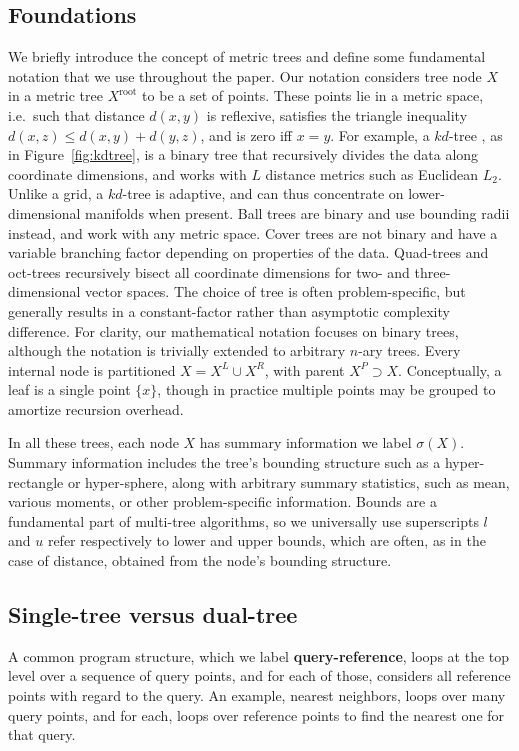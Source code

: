 \documentclass[twoside,leqno,twocolumn]{article}
\newcommand{\union}{\cup}
\newcommand{\fig}[1]{Figure~\ref{fig:#1}}
\newcommand{\mysub}[1]{\subsection{#1} }
\newcommand{\defterm}[1]{{\bf #1}}
\newcommand{\kdroot}[1]{#1^{\text{root}}}
\newcommand{\kdleft}[1]{#1^{\!L}}
\newcommand{\kdright}[1]{#1^{\!R}}
\newcommand{\kdparent}[1]{#1^{\!P}}
\newcommand{\dist}[2]{d(#1,#2)}
\newcommand{\outstat}{\sigma}
\begin{document}
\mysub{Foundations}
We briefly introduce the concept of metric trees and define some fundamental notation that we use throughout the paper.
Our notation considers tree node $X$ in a metric tree $\kdroot{X}$ to be a set of points.
These points lie in a metric space, i.e.~such that distance $\dist{x}{y}$ is reflexive, satisfies the triangle inequality $\dist{x}{z} \leq \dist{x}{y} + \dist{y}{z}$, and is zero iff $x = y$.
For example, a $kd$-tree \cite{preparata_kdtrees}, as in \fig{kdtree}, is a binary tree that recursively divides the data along coordinate dimensions, and works with $L$ distance metrics such as Euclidean $L_2$.
Unlike a grid, a $kd$-tree is adaptive, and can thus concentrate on lower-dimensional manifolds when present.
Ball trees \cite{anchors_balltrees_moore} are binary and use bounding radii instead, and work with any metric space.
Cover trees \cite{covertrees} are not binary and have a variable branching factor depending on properties of the data.
Quad-trees and oct-trees recursively bisect all coordinate dimensions for two- and three-dimensional vector spaces.
The choice of tree is often problem-specific, but generally results in a constant-factor rather than asymptotic complexity difference.
For clarity, our mathematical notation focuses on binary trees, although the notation is trivially extended to arbitrary $n$-ary trees.
Every internal node is partitioned $X = \kdleft{X} \union \kdright{X}$, with parent $\kdparent{X} \supset X$.
Conceptually, a leaf is a single point $\{x\}$, though in practice multiple points may be grouped to amortize recursion overhead.

In all these trees, each node $X$ has summary information we label $\outstat(X)$.
Summary information includes the tree's bounding structure such as a hyper-rectangle or hyper-sphere, along with arbitrary summary statistics, such as mean, various moments, or other problem-specific information.
Bounds are a fundamental part of multi-tree algorithms, so we universally use superscripts $l$ and $u$ refer respectively to lower and upper bounds, which are often, as in the case of distance, obtained from the node's bounding structure.

\mysub{Single-tree versus dual-tree}
A common program structure, which we label \defterm{query-reference}, loops at the top level over a sequence of query points, and for each of those, considers all reference points with regard to the query.
An example, nearest neighbors, loops over many query points, and for each, loops over reference points to find the nearest one for that query.
\end{document}
